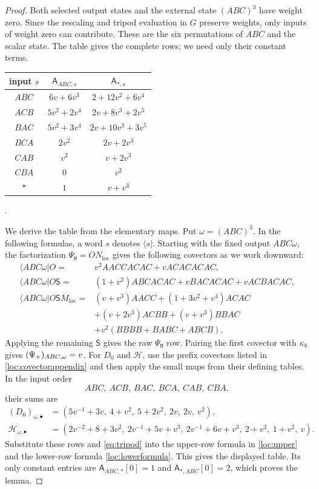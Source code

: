 \documentclass[a4paper,11pt]{amsart}
\newcommand{\wordmiddle}{\mathtt{M}}
\newcommand{\middlemap}{{\Psi}_{{\wordmiddle}}}
\newcommand{\createmap}{{\Psi}_+}
\newcommand{\tpar}{v}
\numberwithin{equation}{subsection}
\theoremstyle{plain}
\theoremstyle{definition}
\theoremstyle{remark}
\begin{document}
\begin{proof}
Both selected output states and the external state $(ABC)^3$ have
weight zero. Since the rescaling and tripod evaluation in $G$
preserve weights, only inputs of weight zero can contribute.
These are the six permutations of $ABC$ and the scalar state.
The table gives the complete rows; we need only their constant terms.
\begin{center}\small
\begin{tabular}{c|c|c}
input $s$&$\mathsf A_{ABC,s}$&$\mathsf A_{*,s}$\\\hline
$ABC$&$6\tpar+6\tpar^3$&$2+12\tpar^2+6\tpar^4$\\
$ACB$&$5\tpar^2+2\tpar^4$&$2\tpar+8\tpar^3+2\tpar^5$\\
$BAC$&$5\tpar^2+3\tpar^4$&$2\tpar+10\tpar^3+3\tpar^5$\\
$BCA$&$2\tpar^2$&$2\tpar+2\tpar^3$\\
$CAB$&$\tpar^2$&$\tpar+2\tpar^3$\\
$CBA$&$0$&$\tpar^2$\\
$*$&$1$&$\tpar+\tpar^3$
\end{tabular}.
\end{center}
We derive the table from the elementary maps. Put $\omega=(ABC)^3$.
In the following formulas, a word $s$ denotes $\langle s|$.
Starting with the fixed output $ABC\omega$, the factorization
$\middlemap=ON_{\mathrm{loc}}$ gives the following covectors as we work
downward:
\begin{align*}
\langle ABC\omega|O={}&\tpar^2 AACCACAC+\tpar ACACACAC,\\
\langle ABC\omega|O\mathsf S={}&(1+\tpar^2)ABCACAC+\tpar BACACAC+\tpar ACBACAC,\\
\langle ABC\omega|O\mathsf S M_{\mathrm{loc}}={}&(\tpar+\tpar^3)AACC+(1+3\tpar^2+\tpar^4)ACAC\\
&+(\tpar+2\tpar^3)ACBB+(\tpar+\tpar^3)BBAC\\
&+\tpar^2(BBBB+BABC+ABCB).
\end{align*}
Applying the remaining $\mathsf S$ gives the raw $\middlemap$ row.
Pairing the first covector with $\kappa_8$ gives ${(\createmap)_{ABC,\omega}}=\nobreak \tpar$.
For $D_0$ and $\mathcal H$, use the prefix covectors listed in
\autoref{loc:covectorappendix} and then apply the small maps from
their defining tables. In the input order
\[
ABC,\ ACB,\ BAC,\ BCA,\ CAB,\ CBA,
\]
their sums are
\begin{align*}
(D_0)_{\omega,\bullet}
&=(5\tpar^{-1}+3\tpar,\ 4+\tpar^2,\ 5+2\tpar^2,\ 2\tpar,\ 2\tpar,\ \tpar^2),\\
\mathcal H_{\omega,\bullet}
&=(2\tpar^{-2}+8+3\tpar^2,\ 2\tpar^{-1}+5\tpar+\tpar^3,\ 2\tpar^{-1}+6\tpar+\tpar^3,\ 2+\tpar^2,\ 1+\tpar^2,\ \tpar).
\end{align*}
Substitute these rows and \autoref{eq:tripod} into the upper-row
formula in \autoref{loc:upper} and the lower-row formula
\autoref{loc:lowerformula}. This gives the displayed table. Its only
constant entries are $\mathsf A_{ABC,*}[0]=1$ and
$\mathsf A_{*,ABC}[0]=2$, which proves the lemma.


\end{proof}
\end{document}
